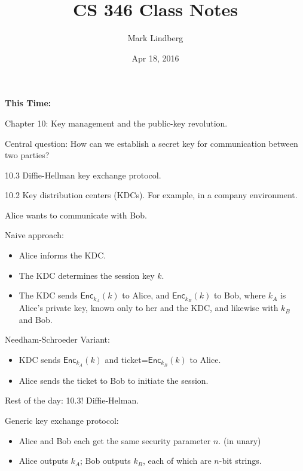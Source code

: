 \documentclass[12pt]{article}
\newcommand{\Enc}{\mathsf{Enc}}
\begin{document}
\title{CS 346 Class Notes}
\date{Apr 18, 2016}
\author{Mark Lindberg}
\maketitle
\thispagestyle{fancy}

{\bf This Time:}

Chapter 10: Key management and the public-key revolution.

Central question: How can we establish a secret key for communication between two parties?

10.3 Diffie-Hellman key exchange protocol.

10.2 Key distribution centers (KDCs). For example, in a company environment.

Alice wants to communicate with Bob.

Naive approach:\begin{itemize}

\item Alice informs the KDC.

\item The KDC determines the session key $k$.

\item The KDC sends $\Enc_{k_A}(k)$ to Alice, and $\Enc_{k_B}(k)$ to Bob, where $k_A$ is Alice's private key, known only to her and the KDC, and likewise with $k_B$ and Bob.

\end{itemize}

Needham-Schroeder Variant:\begin{itemize}

\item KDC sends $\Enc_{k_A}(k)$ and ticket=$\Enc_{k_B}(k)$ to Alice.

\item Alice sends the ticket to Bob to initiate the session.

\end{itemize}

Rest of the day: 10.3! Diffie-Helman.

Generic key exchange protocol:\begin{itemize}

\item Alice and Bob each get the same security parameter $n$. (in unary)

\item Alice outputs $k_A$; Bob outputs $k_B$, each of which are $n$-bit strings.

\end{itemize}
\end{document}
